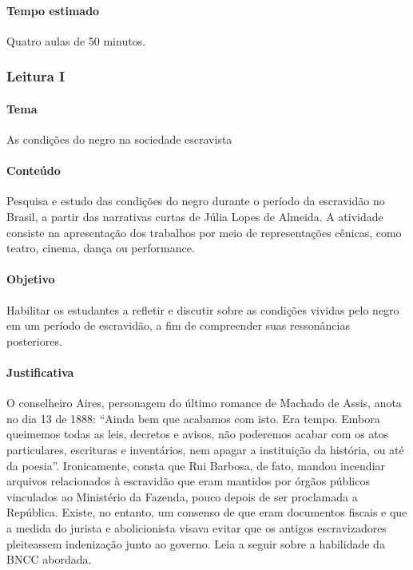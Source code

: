 \documentclass[12pt]{extarticle}
\begin{document}
\paragraph{Tempo estimado} Quatro aulas de 50 minutos.



\subsubsection{Leitura I}


\paragraph{Tema} As condições do negro na sociedade escravista

\paragraph{Conteúdo} Pesquisa e estudo das condições do negro durante o
período da escravidão no Brasil, a partir das narrativas curtas de Júlia
Lopes de Almeida. A atividade consiste na apresentação dos trabalhos por
meio de representações cênicas, como teatro, cinema, dança ou
performance.


\paragraph{Objetivo} Habilitar os estudantes a refletir e discutir sobre
as condições vividas pelo negro em um período de escravidão, a fim de
compreender suas ressonâncias posteriores.


\paragraph{Justificativa} O conselheiro Aires, personagem do último
romance de Machado de Assis, anota no dia 13 de 1888: ``Ainda bem que
acabamos com isto. Era tempo. Embora queimemos todas as leis, decretos e
avisos, não poderemos acabar com os atos particulares, escrituras e
inventários, nem apagar a instituição da história, ou até da poesia''.
Ironicamente, consta que Rui Barbosa, de fato, mandou incendiar arquivos
relacionados à escravidão que eram mantidos por órgãos públicos
vinculados ao Ministério da Fazenda, pouco depois de ser proclamada a
República. Existe, no entanto, um consenso de que eram documentos
fiscais e que a medida do jurista e abolicionista visava evitar que os
antigos escravizadores pleiteassem indenização junto ao governo. 
Leia a seguir sobre a habilidade da BNCC abordada.
\end{document}
